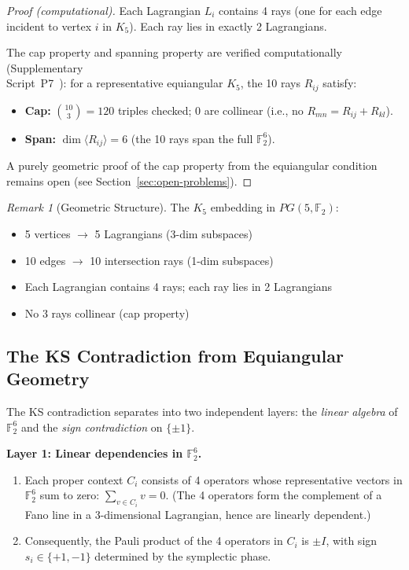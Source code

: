 \documentclass[11pt,a4paper]{article}
\theoremstyle{remark}
\newtheorem{remark}[theorem]{Remark}
\newcommand{\F}{\mathbb{F}}
\begin{document}
\begin{proof}[Proof (computational)]
Each Lagrangian $L_i$ contains 4 rays (one for each edge incident to
vertex $i$ in $K_5$). Each ray lies in exactly 2 Lagrangians.

The cap property and spanning property are verified computationally
(Supplementary \\Script~P7~\cite{PaperXsuppl}):
for a representative equiangular $K_5$, the 10 rays $R_{ij}$ satisfy:
\begin{itemize}
  \item \textbf{Cap:} $\binom{10}{3} = 120$ triples checked;
    0 are collinear (i.e., no $R_{mn} = R_{ij} + R_{kl}$).
  \item \textbf{Span:} $\dim\langle R_{ij} \rangle = 6$
    (the 10 rays span the full $\F_2^6$).
\end{itemize}
A purely geometric proof of the cap property from the equiangular
condition remains open (see Section~\ref{sec:open-problems}).
\end{proof}

\begin{remark}[Geometric Structure]
The $K_5$ embedding in $PG(5, \F_2)$:
\begin{itemize}
  \item 5 vertices $\to$ 5 Lagrangians (3-dim subspaces)
  \item 10 edges $\to$ 10 intersection rays (1-dim subspaces)
  \item Each Lagrangian contains 4 rays; each ray lies in 2 Lagrangians
  \item No 3 rays collinear (cap property)
\end{itemize}
\end{remark}

\subsection{The KS Contradiction from Equiangular Geometry}

The KS contradiction separates into two independent layers:
the \emph{linear algebra} of $\F_2^6$ and the \emph{sign contradiction}
on $\{\pm 1\}$.

\medskip
\noindent\textbf{Layer 1: Linear dependencies in $\F_2^6$.}

\begin{enumerate}
  \item Each proper context $C_i$ consists of 4 operators whose
    representative vectors in $\F_2^6$ sum to zero:
    $\sum_{v \in C_i} v = 0$.
    (The 4 operators form the complement of a Fano line in a
    3-dimensional Lagrangian, hence are linearly dependent.)
  \item Consequently, the Pauli product of the 4 operators in $C_i$
    is $\pm I$, with sign $s_i \in \{+1, -1\}$ determined by the
    symplectic phase.
\end{enumerate}
\end{document}
